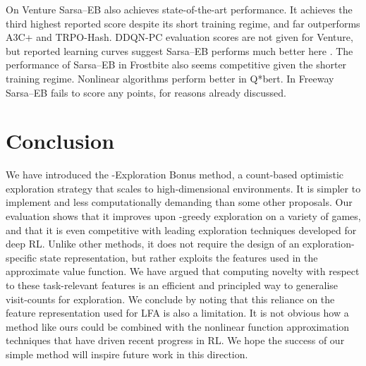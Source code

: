 \documentclass{article}
\theoremstyle{definition}
\theoremstyle{definition}
\theoremstyle{plain}
\theoremstyle{plain}
\theoremstyle{plain}
\begin{document}
On Venture Sarsa--EB also achieves state-of-the-art performance.
It achieves the third highest reported score despite its short training
regime, and far outperforms A3C+ and TRPO-Hash. DDQN-PC evaluation
scores are not given for Venture, but reported learning curves suggest
Sarsa--EB performs much better here \cite{Bellemare2016}.
The performance of Sarsa--EB in Frostbite also seems competitive
given the shorter training regime. Nonlinear algorithms perform better
in Q{*}bert. In Freeway Sarsa--EB fails to score any points,
for reasons already discussed.


\section{Conclusion}

We have introduced the -Exploration Bonus method, a count-based
optimistic exploration strategy that scales to high-dimensional environments.
It is simpler to implement and less computationally demanding than
some other proposals. Our evaluation shows that it improves upon -greedy
exploration on a variety of games, and that it is even competitive
with leading exploration techniques developed for deep RL. Unlike
other methods, it does not require the design of an exploration-specific
state representation, but rather exploits the features used in the
approximate value function. We have argued that computing novelty
with respect to these task-relevant features is an efficient and principled
way to generalise visit-counts for exploration. We conclude by noting
that this reliance on the feature representation used for LFA is also
a limitation. It is not obvious how a method like ours could be combined
with the nonlinear function approximation techniques that have driven
recent progress in RL. We hope the success of our simple method will
inspire future work in this direction.



\end{document}
